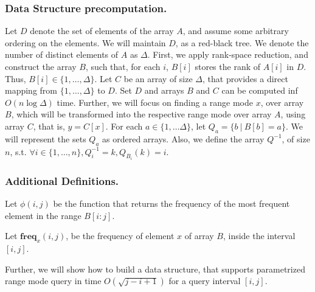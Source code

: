 \documentclass[runningheads]{llncs}
\begin{document}
\subsubsection{Data Structure precomputation.} Let $D$ denote the set of elements of the array $A$, and assume some arbitrary ordering on the elements. 
We will maintain $D$, as a red-black tree.
We denote the number of distinct elements of $A$ as $\Delta$. First, we apply rank-space reduction, and 
construct the array $B$, such that, for each $i$, $B[i]$ stores the rank of $A[i]$ in $D$. Thus, $B[i]\in \{1,\dots, \Delta\}$.
Let $C$ be an array of size $\Delta$, that provides a direct mapping from $\{1,\dots,\Delta\}$ to $D$. Set $D$ and arrays $B$ and $C$
can be computed inf $O(n \log\Delta )$ time. Further, we will focus on finding a range mode $x$, over array $B$, which will be transformed into the 
respective range mode over array $A$, using array $C$, that is, $y=C[x]$.
For each $a\in \{1,\dots \Delta\}$, let $Q_a = \{ b\ |\ B[b]=a  \} $. We will represent the sets $Q_a$ as ordered arrays. Also, we define the array $Q^{-1}$, of size $n$, s.t. $\forall i \in \{1,\dots ,n\}, Q^{-1}_i=k, Q_{B_i}(k)=i$.



\subsubsection{Additional Definitions.}
Let $\phi(i,j)$ be the function that returns the frequency of the most frequent element in the range $B[i:j]$.

Let $\textbf{freq}_x(i,j)$, be the frequency of element $x$ of array $B$, inside the interval $[i,j]$.


Further, we will show how to build a data structure, that supports parametrized range mode query in time $O(\sqrt{j-i+1})$ for a query interval
$[i,j]$.
\end{document}
